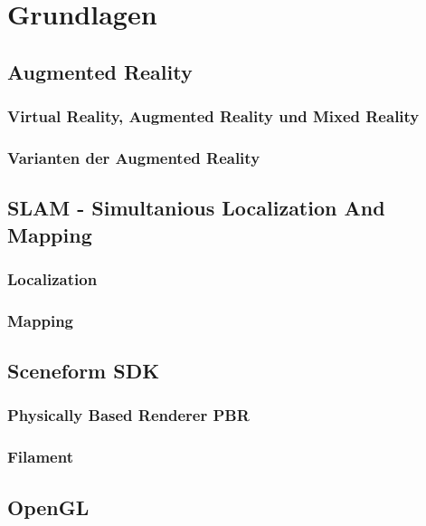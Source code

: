 
\chapter{Grundlagen}
\section{Augmented Reality}
\subsection{Virtual Reality, Augmented Reality und Mixed Reality}
\subsection{Varianten der Augmented Reality}

\section{SLAM - Simultanious Localization And Mapping}
\subsection{Localization}
\subsection{Mapping}

\section{Sceneform SDK}
\subsection{Physically Based Renderer PBR}
\subsection{Filament}

\section{OpenGL}
